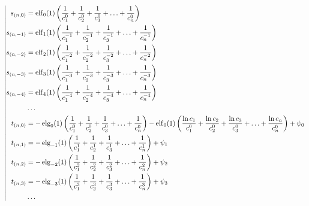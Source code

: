 \begin{equation*} \left| \begin{aligned}
s_{(n,0)} &=
  \elf_0(1) \left(
  \frac{1}{c_1^0}
+ \frac{1}{c_2^0}
+ \frac{1}{c_3^0}
+ \ldots
+ \frac{1}{c_n^0} \right) \\
%
s_{(n,-1)} &=
  \elf_1(1) \left(
  \frac{1}{c_1^{-1}}
+ \frac{1}{c_2^{-1}}
+ \frac{1}{c_3^{-1}}
+ \ldots
+ \frac{1}{c_n^{-1}} \right) \\
%
s_{(n,-2)} &=
  \elf_2(1) \left(
  \frac{1}{c_1^{-2}}
+ \frac{1}{c_2^{-2}}
+ \frac{1}{c_3^{-2}}
+ \ldots
+ \frac{1}{c_n^{-2}} \right) \\
%
s_{(n,-3)} &=
  \elf_3(1) \left(
  \frac{1}{c_1^{-3}}
+ \frac{1}{c_2^{-3}}
+ \frac{1}{c_3^{-3}}
+ \ldots
+ \frac{1}{c_n^{-3}} \right) \\
%
s_{(n,-4)} &=
  \elf_4(1) \left(
  \frac{1}{c_1^{-4}}
+ \frac{1}{c_2^{-4}}
+ \frac{1}{c_3^{-4}}
+ \ldots
+ \frac{1}{c_n^{-4}} \right) \\
%
&\ldots \\
%
t_{(n,0)} &=
- \elg_0(1) \left(
  \frac{1}{c_1^0}
+ \frac{1}{c_2^0}
+ \frac{1}{c_3^0}
+ \ldots
+ \frac{1}{c_n^0} \right)
- \elf_0(1) \left(
  \frac{\ln{c_1}}{c_1^0}
+ \frac{\ln{c_2}}{c_2^0}
+ \frac{\ln{c_3}}{c_3^0}
+ \ldots
+ \frac{\ln{c_n}}{c_n^0} \right)
+ \psi_0 \\
%
t_{(n,1)} &=
- \elg_{-1}(1) \left(
  \frac{1}{c_1^1}
+ \frac{1}{c_2^1}
+ \frac{1}{c_3^1}
+ \ldots
+ \frac{1}{c_n^1} \right)
+ \psi_1 \\
%
t_{(n,2)} &=
- \elg_{-2}(1) \left(
  \frac{1}{c_1^2}
+ \frac{1}{c_2^2}
+ \frac{1}{c_3^2}
+ \ldots
+ \frac{1}{c_n^2} \right)
+ \psi_2 \\
%
t_{(n,3)} &=
- \elg_{-3}(1) \left(
  \frac{1}{c_1^3}
+ \frac{1}{c_2^3}
+ \frac{1}{c_3^3}
+ \ldots
+ \frac{1}{c_n^3} \right)
+ \psi_3 \\
%
&\ldots \\
\end{aligned} \right. \end{equation*}